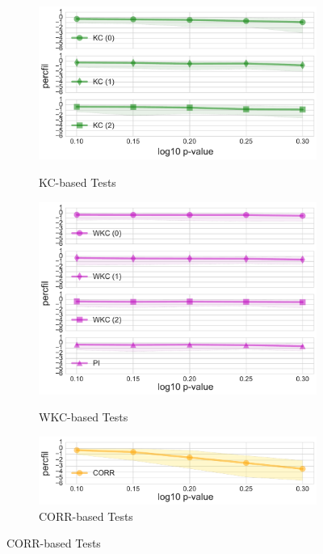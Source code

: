 \documentclass[12pt]{article}
\begin{document}
\begin{center}
\begin{figure}[htp!]
\begin{subfigure}{.45\textwidth}
      \label{fig:sub_silh}
    \end{subfigure}
    \begin{subfigure}{.45\textwidth}
      \centering
      \caption{KC-based Tests}
      \includegraphics[width=\linewidth]{sub_contour_lineplot_log10_norm_False.pdf}
      \label{fig:sub_contour}
    \end{subfigure}
    \begin{subfigure}{.45\textwidth}
      \centering
      \caption{WKC-based Tests}
      \includegraphics[width=\linewidth]{sub_weight_lineplot_log10_norm_False.pdf}
      \label{fig:sub_weight}
    \end{subfigure}
    \begin{subfigure}{.45\textwidth}
      \caption{CORR-based Tests}
      \includegraphics[width=\linewidth]{sub_corr_lineplot_log10_norm_False.pdf}

\end{subfigure}
\end{figure}
\end{center}
\end{document}
